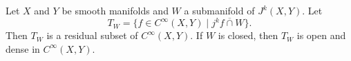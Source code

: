 Let $X$ and $Y$ be smooth manifolds and $W$ a submanifold of $J^{k}(X, Y)$. Let
$$T_{W} = \{ f \in C^{\infty}(X, Y) \mid j^{k} f \mathrel{\overline{\cap}} W \}.$$
Then $T_{W}$ is a residual subset of $C^{\infty}(X, Y)$. If $W$ is closed, then $T_{W}$ is open and dense in $C^{\infty}(X, Y)$.
